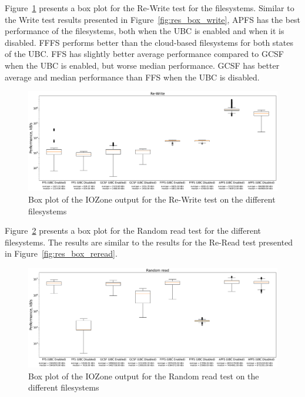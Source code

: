 \FloatBarrier

Figure~\ref{fig:res_box_rewrite} presents a box plot for the \mbox{Re-Write} test for the filesystems. Similar to the Write test results presented in Figure~\ref{fig:res_box_write}, \gls{APFS} has the best performance of the filesystems, both when the \gls{UBC} is enabled and when it is disabled. \gls{FFFS} performs better than the \mbox{cloud-based} filesystems for both states of the \gls{UBC}. \gls{FFS} has slightly better average performance compared to \gls{GCSF} when the \gls{UBC} is enabled, but worse median performance. \gls{GCSF} has better average and median performance than \gls{FFS} when the \gls{UBC} is disabled.

\begin{figure}
	\label{fig:res_box_rewrite}
	\begin{center}
		\includegraphics[width=1.0\textwidth]{figures.nosync/benchmarking/Re-Write-boxplot.pdf}
	\end{center}
	\caption[Box plot of the IOZone output for the Re-Write test]{Box plot of the IOZone output for the Re-Write test on the different filesystems}
\end{figure}

\FloatBarrier

Figure~\ref{fig:res_box_rndread} presents a box plot for the Random read test for the different filesystems. The results are similar to the results for the \mbox{Re-Read} test presented in Figure~\ref{fig:res_box_reread}.

\begin{figure}
	\label{fig:res_box_rndread}
	\begin{center}
		\includegraphics[width=1.0\textwidth]{figures.nosync/benchmarking/Random read-boxplot.pdf}
	\end{center}
	\caption[Box plot of the IOZone output for the Random read test]{Box plot of the IOZone output for the Random read test on the different filesystems}
\end{figure}

